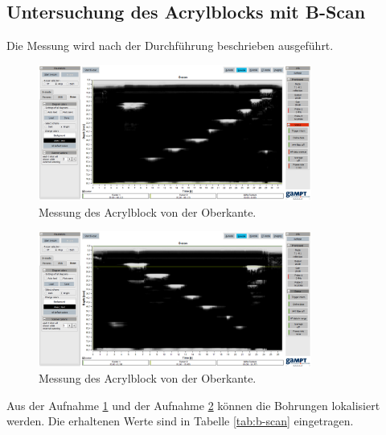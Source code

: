 \subsection{Untersuchung des Acrylblocks mit B-Scan}
Die Messung wird nach der Durchführung beschrieben ausgeführt.
\begin{figure}[H]
  \centering
  \includegraphics[width=0.8\textwidth]{content/bscan-2mhz_oberseite.png}
  \caption{Messung des Acrylblock von der Oberkante.}
  \label{fig:obs}
\end{figure}
\begin{figure}[H]
  \centering
  \includegraphics[width=0.8\textwidth]{content/bscan-2mhz_unterseite.png}
  \caption{Messung des Acrylblock von der Oberkante.}
  \label{fig:unts}
\end{figure}
Aus der Aufnahme \ref{fig:obs} und der Aufnahme \ref{fig:unts} können die Bohrungen lokalisiert werden.
Die erhaltenen Werte sind in Tabelle \ref{tab:b-scan} eingetragen.
